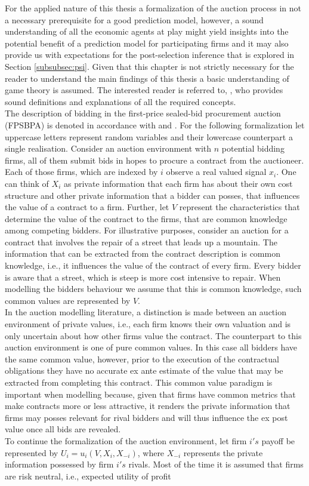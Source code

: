 \documentclass[a4paper,12pt, headsepline]{scrartcl}
\numberwithin{equation}{section}
\begin{document}
For the applied nature of this thesis a formalization of the auction process in not a necessary prerequisite 
for a good prediction model, however, a sound understanding of all the economic agents at play might yield insights into the potential benefit of a prediction model for participating firms and it may also provide us with expectations for the post-selection inference that is explored in Section \ref{subsubsec:psi}. Given that this chapter is not strictly necessary for the reader to understand the main findings of this thesis a basic understanding of game theory is assumed. The interested reader is referred to, \citet{tadelis12}, who provides sound definitions and explanations of all the required concepts.\\
The description of bidding in the first-price sealed-bid procurement auction (FPSBPA) is denoted in accordance with \citet{milgrom82} and \citet{HandbookIndustrialOrga}. For the following formalization let uppercase letters represent random variables and their lowercase counterpart a single realisation. Consider an auction environment with $n$ potential bidding firms, all of them submit bids in hopes to procure a contract from the auctioneer. Each of those firms, which are indexed by $i$ observe a real valued signal $x_i$. One can think of $X_i$ as private information that each firm has about their own cost structure and other private information that a bidder can posses, that influences the value of a contract to a firm. Further, let $V$ represent the characteristics that determine the value of the contract to the firms, that are common knowledge among competing bidders. For illustrative purposes, consider an auction for a contract that involves the repair of a street that leads up a mountain. The information that can be extracted from the contract description is common knowledge, i.e., it influences the value of the contract of every firm. Every bidder is aware that a street, which is steep is more cost intensive to repair. When modelling the bidders behaviour we assume that this is common knowledge, such common values are represented by $V$.\\ In the auction modelling literature, a distinction is made between an auction environment of private values, i.e., each firm knows their own valuation and is only uncertain about how other firms value the contract. The counterpart to this auction environment is one of pure common values. In this case all bidders have the same common value, however, prior to the execution of the contractual obligations they have no accurate ex ante estimate of the value that may be extracted from completing this contract. This common value paradigm is important when modelling because, given that firms have common metrics that make contracts more or less attractive, it renders the private information that firms may posses relevant for rival bidders and will thus influence the ex post value once all bids are revealed.\\ To continue the formalization of the auction environment, let firm $i's$ payoff be represented by $U_i = u_i(V, X_i, X_{-i})$, where $X_{-i}$ represents the private information possessed by firm $i's$ rivals. Most of the time it is assumed that firms are risk neutral, i.e., expected utility of profit 
\end{document}

